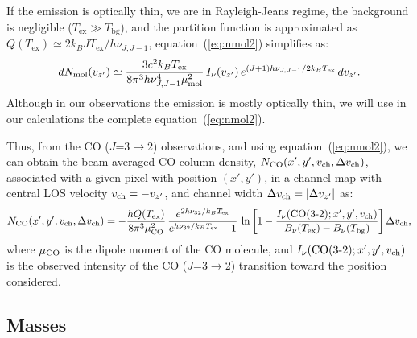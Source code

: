\documentclass[12pt]{mythesis}
\begin{document}
If the emission is optically thin, we are in Rayleigh-Jeans regime, the background is negligible ($T_\mathrm{ex} \gg T_\mathrm{bg}$), and the partition function is approximated as $Q(T_\mathrm{ex})\simeq 2 k_B J T_\mathrm{ex}/h \nu_{J,J-1}$, equation~(\ref{eq:nmol2}) simplifies as:
\begin{equation}
 d N_\mathrm{mol}(v_{z'}) \simeq \frac{3 c^2 k_B T_\mathrm{ex}}{8 \pi^3 h \nu_{J,J-1}^4 \mu_{\rm mol}^2}\, 
 I_\nu(v_{z'})\, e^{(J+1)h\nu_{J,J-1}/2k_B T_\mathrm{ex}}\, dv_{z'}.
\label{eq:nmolthin}
\end{equation}
Although in our observations the emission is mostly optically thin, we will use in our calculations the complete equation~(\ref{eq:nmol2}). 

Thus, from the CO ($J$=3$\rightarrow$2) observations, and using equation~(\ref{eq:nmol2}), we can obtain the beam-averaged CO column density, $N_{\rm CO}(x',y',v_{\rm ch},\Delta v_{\rm ch})$, associated with a given pixel with position $(x',y')$, in a channel map with central LOS velocity $v_{\rm ch}=-v_{z'}$, and channel width $\Delta v_{\rm ch}=|\Delta v_{z'}|$ as:
\begin{equation}
N_{\rm CO}(x',y',v_{\rm ch},\Delta v_{\rm ch}) = - \frac{h Q(T_\mathrm{ex})}{8 \pi^3 \mu_{\rm CO}^2}\, 
\frac{e^{2 h\nu_{32}/k_B T_\mathrm{ex}}}{e^{h\nu_{32}/k_B T_\mathrm{ex}}-1}\, \ln{\left[1- \frac{I_\nu({\rm CO}(3\mbox{-}2); x',y',v_{\rm ch})}{B_\nu(T_\mathrm{ex}) - B_\nu(T_{\rm bg})}\right]}\, \Delta v_{\rm ch}, 
\label{eq:NCO1}
\end{equation}
where $\mu_{\rm CO}$ is the dipole moment of the CO molecule, and $I_\nu({\rm CO}(3\mbox{-}2); x',y',v_{\rm ch})$ is the observed intensity of the CO ($J$=3$\rightarrow$2) transition toward the position considered. 

\subsection{Masses}
\end{document}
